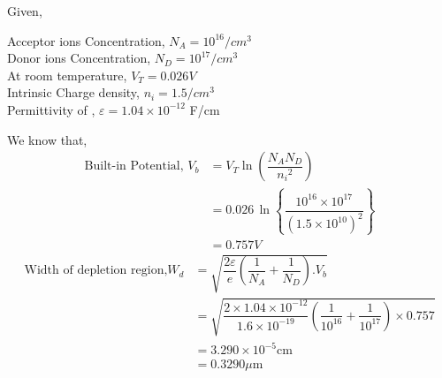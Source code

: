 \documentclass[a4aper,12pt]{report}
\begin{document}
\vspace*{8pt}
\begin{tcolorbox}[breakable, title={\textbf{Example 1.3: }Consider a silicon pn-junction at room temperature doped at $N_A=10^{16}/cm^3$ in the p-region and $N_D=10^{17}/cm^3$ in the n-region. Intrinsic carrier density is $1.5/cm^3$ at room temperature. Calculate the width of depletion region.}]
    Given,
    \begin{adjustwidth}{1cm}{5pt}
        Acceptor ions Concentration, $N_A =10^{16}/cm^3$ \\
        Donor ions Concentration, $N_D=10^{17}/cm^3$ \\
        At room temperature, $V_T = 0.026 V$ \\ 
        Intrinsic Charge density, $n_i = 1.5/cm^3$ \\
        Permittivity of , $\varepsilon = 1.04\times 10^{-12}$ F/cm 
    \end{adjustwidth}
    We know that,
    \begin{align*}
        \text{Built-in Potential, }V_b &= V_T\ln\left(\dfrac{N_AN_D}{{n_i}^2}\right) \\ 
        &=0.026\, \ln\left\{\dfrac{10^{16}\times 10^{17}}{(1.5\times 10^{10})^2}\right\} \\ 
        &= 0.757 V
    \end{align*}
    \begin{align*}
        \text{Width of depletion region,} W_d &= \sqrt{\dfrac{2\varepsilon}{e}\left(\dfrac{1}{N_A}+\dfrac{1}{N_D}\right).V_b} \\ 
        &= \sqrt{\dfrac{2\times 1.04\times 10^{-12}}{1.6\times 10^{-19}}\left(\dfrac{1}{10^{16}}+\dfrac{1}{10^{17}}\right)\times 0.757} \\
        &= 3.290\times 10^{-5}\text{cm} \\ 
        &= 0.3290 \mu\text{m}
    \end{align*}
\end{tcolorbox}
\end{document}
